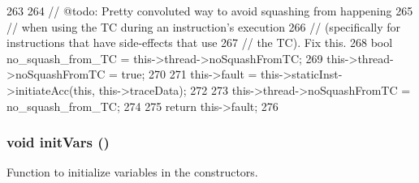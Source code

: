 \begin{DoxyCode}
263 {
264     // @todo: Pretty convoluted way to avoid squashing from happening
265     // when using the TC during an instruction's execution
266     // (specifically for instructions that have side-effects that use
267     // the TC).  Fix this.
268     bool no_squash_from_TC = this->thread->noSquashFromTC;
269     this->thread->noSquashFromTC = true;
270 
271     this->fault = this->staticInst->initiateAcc(this, this->traceData);
272 
273     this->thread->noSquashFromTC = no_squash_from_TC;
274 
275     return this->fault;
276 }
\end{DoxyCode}
\hypertarget{classInOrderDynInst_a1b19937d8cca25bf52a51ae7de67ea94}{
\subsubsection[{initVars}]{\setlength{\rightskip}{0pt plus 5cm}void initVars ()}}
\label{classInOrderDynInst_a1b19937d8cca25bf52a51ae7de67ea94}
Function to initialize variables in the constructors. 


